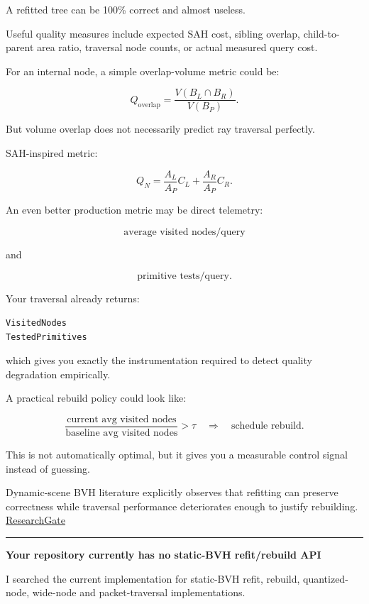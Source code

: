 A refitted tree can be 100\% correct and almost useless.

Useful quality measures include expected SAH cost, sibling overlap, child-to-parent area ratio, traversal node counts, or actual measured query cost.

For an internal node, a simple overlap-volume metric could be:

\[
Q_{\text{overlap}}
=
\frac{
V(B_L\cap B_R)
}{
V(B_P)
}.
\]

But volume overlap does not necessarily predict ray traversal perfectly.

SAH-inspired metric:

\[
Q_N
=
\frac{A_L}{A_P}C_L
+
\frac{A_R}{A_P}C_R.
\]

An even better production metric may be direct telemetry:

\[
\text{average visited nodes/query}
\]

and

\[
\text{primitive tests/query}.
\]

Your traversal already returns:

\begin{verbatim}
VisitedNodes
TestedPrimitives
\end{verbatim}

which gives you exactly the instrumentation required to detect quality degradation empirically.

A practical rebuild policy could look like:

\[
\frac{
\text{current avg visited nodes}
}{
\text{baseline avg visited nodes}
}
>\tau
\quad\Rightarrow\quad
\text{schedule rebuild}.
\]

This is not automatically optimal, but it gives you a measurable control signal instead of guessing.

Dynamic-scene BVH literature explicitly observes that refitting can preserve correctness while traversal performance deteriorates enough to justify rebuilding. \href{https://www.researchgate.net/publication/234777055_Special_Section_Parallel_Graphics_and_Visualization_Fast_parallel_and_asynchronous_construction_of_BVHs_for_ray_tracing_animated_scenes?utm_source=chatgpt.com}{ResearchGate}

\begin{center}\rule{0.5\linewidth}{0.5pt}\end{center}

\textbf{Your repository currently has no static-BVH refit/rebuild API}

I searched the current  implementation for static-BVH refit, rebuild, quantized-node, wide-node and packet-traversal implementations.

